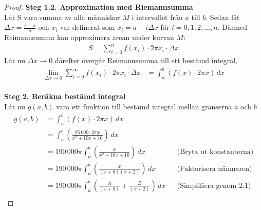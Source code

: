 \documentclass{article}
\begin{document}
\begin{proof}
\textbf{Steg 1.2. Approximation med Riemannsumma} \\
Låt S vara summa av alla människor \( M \) i intervallet från \( a \) till \( b \).
Sedan låt \( \Delta x = \frac{b-a}{n} \) och \( x_i \) var definerat som \( x_i
= a + i \Delta x \) för \( i = 0, 1, 2, \ldots, n \). Därmed Reimannsumma kan
approximera arean under kurvan \( M \):
\begin{align*}
S = \sum_{i=0}^{n} f(x_i) \cdot 2 \pi x_i \cdot \Delta x
\end{align*}
Låt nu \( \Delta x \to 0 \) därefter övergår  Reimannsumma till ett bestämd integral, 
\begin{align*}
	\lim_{\Delta x \to 0} \sum_{i=0}^{\infty} f(x_i) \cdot 2 \pi x_i \cdot \Delta x &=\int_{a}^{b}{\left(f(x) \cdot 2\pi x\right) \, dx } \\
\end{align*}

\textbf{Steg 2. Beräkna bestämd integral} \\ 
Låt nu \( g(a, b) \) vara ett funktion till bestämd integral mellan gränserna
\( a \) och \( b \)
\begin{align*}
	g(a,b) &=\int_{a}^{b}{\left(f(x) \cdot 2\pi x\right) \, dx } \\
	       &= \int_{a}^{b}{\left(\frac{95\, 000 \cdot 2 \pi x}{x^2 + 10x + 16}\right) \, dx } \\
	&= 190\, 000 \pi \int_{a}^{b}{\left(\frac{x}{x^2 + 10x + 16}\right) \, dx }
	&&\text{(Bryta ut konstanterna)} \\
	&= 190\, 000 \pi \int_{a}^{b}{\left(\frac{x}{(x + 8)(x + 2)}\right) \, dx }
	&&\text{(Faktorisera nämnaren)} \\
	&= 190\, 000 \pi \int_{a}^{b}{\left(\frac{A}{(x + 8)} + \frac{B}{(x + 2)}\right) \,
	dx }
	&&\text{(Simplifiera genom 2.1)} \\
\end{align*}


\end{proof}
\end{document}
